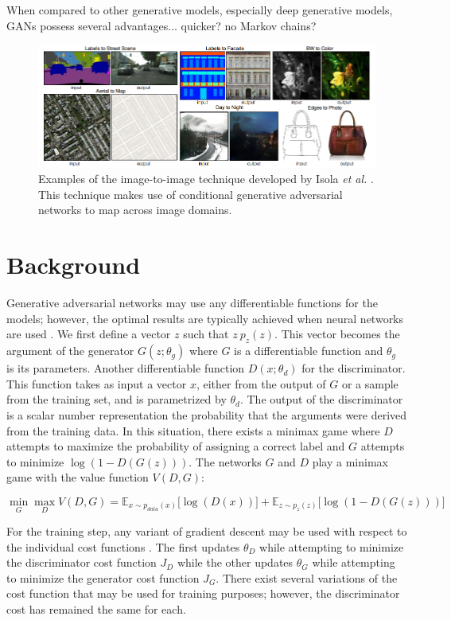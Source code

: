 \documentclass[11pt]{article}
\begin{document}
When compared to other generative models, especially deep generative models, GANs possess several advantages... quicker? no Markov chains?

\begin{figure}
\centering
\includegraphics[scale=0.55]{img2img}
\caption{Examples of the image-to-image technique developed by Isola \textit{et al.} \citep{2016arXiv161107004I}. This technique makes use of conditional generative adversarial networks to map across image domains.}
\label{fig:img2img}
\end{figure}

\section{Background}
Generative adversarial networks may use any differentiable functions for the models; however, the optimal results are typically achieved when neural networks are used \citep{2014arXiv1406.2661G}. We first define a vector $z$ such that $z~p_z(z)$. This vector becomes the argument of the generator $G(z;\theta_g)$ where $G$ is a differentiable function and $\theta_g$ is its parameters. Another differentiable function $D(x;\theta_d)$ for the discriminator. This function takes as input a vector $x$, either from the output of $G$ or a sample from the training set, and is parametrized by $\theta_d$. The output of the discriminator is a scalar number representation the probability that the arguments were derived from the training data. In this situation, there exists a minimax game where $D$ attempts to maximize the probability of assigning a correct label and $G$ attempts to minimize $\log(1-D(G(z)))$. The networks $G$ and $D$ play a minimax game with the value function $V(D,G)$:

$$\min_{G}\max_{D}V(D, G) = \mathbb{E}_{x\sim p_{data}(x)}\Big[\log(D(x))\Big] + \mathbb{E}_{z\sim p_z(z)}\Big[\log(1-D(G(z)))\Big]$$

For the training step, any variant of gradient descent may be used with respect to the individual cost functions \citep{2017arXiv170100160G}. The first updates $\theta_D$ while attempting to minimize the discriminator cost function $J_D$ while the other updates $\theta_G$ while attempting to minimize the generator cost function $J_G$. There exist several variations of the cost function that may be used for training purposes; however, the discriminator cost has remained the same for each.
\end{document}
